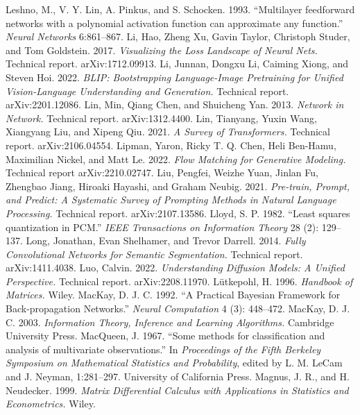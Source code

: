  Leshno, M., V. Y. Lin, A. Pinkus, and S. Schocken. 1993. ``Multilayer feedforward networks with a polynomial activation function can approximate any function.'' \emph{Neural Networks} 6:861--867.
 Li, Hao, Zheng Xu, Gavin Taylor, Christoph Studer, and Tom Goldstein. 2017. \emph{Visualizing the Loss Landscape of Neural Nets.} Technical report. arXiv:1712.09913.
 Li, Junnan, Dongxu Li, Caiming Xiong, and Steven Hoi. 2022. \emph{BLIP: Bootstrapping Language-Image Pretraining for Unified Vision-Language Understanding and Generation.} Technical report. arXiv:2201.12086.
 Lin, Min, Qiang Chen, and Shuicheng Yan. 2013. \emph{Network in Network.} Technical report. arXiv:1312.4400.
 Lin, Tianyang, Yuxin Wang, Xiangyang Liu, and Xipeng Qiu. 2021. \emph{A Survey of Transformers.} Technical report. arXiv:2106.04554.
 Lipman, Yaron, Ricky T. Q. Chen, Heli Ben-Hamu, Maximilian Nickel, and Matt Le. 2022. \emph{Flow Matching for Generative Modeling.} Technical report arXiv:2210.02747.
 Liu, Pengfei, Weizhe Yuan, Jinlan Fu, Zhengbao Jiang, Hiroaki Hayashi, and Graham Neubig. 2021. \emph{Pre-train, Prompt, and Predict: A Systematic Survey of Prompting Methods in Natural Language Processing.} Technical report. arXiv:2107.13586.
 Lloyd, S. P. 1982. ``Least squares quantization in PCM.'' \emph{IEEE Transactions on Information Theory} 28 (2): 129--137.
 Long, Jonathan, Evan Shelhamer, and Trevor Darrell. 2014. \emph{Fully Convolutional Networks for Semantic Segmentation.} Technical report. arXiv:1411.4038.
 Luo, Calvin. 2022. \emph{Understanding Diffusion Models: A Unified Perspective.} Technical report. arXiv:2208.11970.
 L\"utkepohl, H. 1996. \emph{Handbook of Matrices.} Wiley.
 MacKay, D. J. C. 1992. ``A Practical Bayesian Framework for Back-propagation Networks.'' \emph{Neural Computation} 4 (3): 448--472.
 MacKay, D. J. C. 2003. \emph{Information Theory, Inference and Learning Algorithms.} Cambridge University Press.
 MacQueen, J. 1967. ``Some methods for classification and analysis of multivariate observations.'' In \emph{Proceedings of the Fifth Berkeley Symposium on Mathematical Statistics and Probability}, edited by L. M. LeCam and J. Neyman, 1:281--297. University of California Press.
 Magnus, J. R., and H. Neudecker. 1999. \emph{Matrix Differential Calculus with Applications in Statistics and Econometrics.} Wiley.
